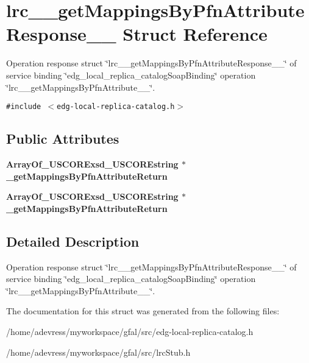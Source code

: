 \section{lrc\_\-\_\-get\-Mappings\-By\-Pfn\-Attribute\-Response\_\-\_\- Struct Reference}
\label{structlrc____getMappingsByPfnAttributeResponse____}
Operation response struct \char`\"{}lrc\_\-\_\-get\-Mappings\-By\-Pfn\-Attribute\-Response\_\-\_\-\char`\"{} of service binding \char`\"{}edg\_\-local\_\-replica\_\-catalog\-Soap\-Binding\char`\"{} operation \char`\"{}lrc\_\-\_\-get\-Mappings\-By\-Pfn\-Attribute\_\-\_\-\char`\"{}.  


{\tt \#include $<$edg-local-replica-catalog.h$>$}

\subsection*{Public Attributes}
\begin{CompactItemize}
\item 
\bf{Array\-Of\_\-USCORExsd\_\-USCOREstring} $\ast$ \textbf{\_\-get\-Mappings\-By\-Pfn\-Attribute\-Return}\label{structlrc____getMappingsByPfnAttributeResponse_____bb8eb49f85b9cd480c332a031385e87c}

\item 
\bf{Array\-Of\_\-USCORExsd\_\-USCOREstring} $\ast$ \textbf{\_\-get\-Mappings\-By\-Pfn\-Attribute\-Return}\label{structlrc____getMappingsByPfnAttributeResponse_____bb8eb49f85b9cd480c332a031385e87c}

\end{CompactItemize}


\subsection{Detailed Description}
Operation response struct \char`\"{}lrc\_\-\_\-get\-Mappings\-By\-Pfn\-Attribute\-Response\_\-\_\-\char`\"{} of service binding \char`\"{}edg\_\-local\_\-replica\_\-catalog\-Soap\-Binding\char`\"{} operation \char`\"{}lrc\_\-\_\-get\-Mappings\-By\-Pfn\-Attribute\_\-\_\-\char`\"{}. 



The documentation for this struct was generated from the following files:\begin{CompactItemize}
\item 
/home/adevress/myworkspace/gfal/src/edg-local-replica-catalog.h\item 
/home/adevress/myworkspace/gfal/src/lrc\-Stub.h\end{CompactItemize}
